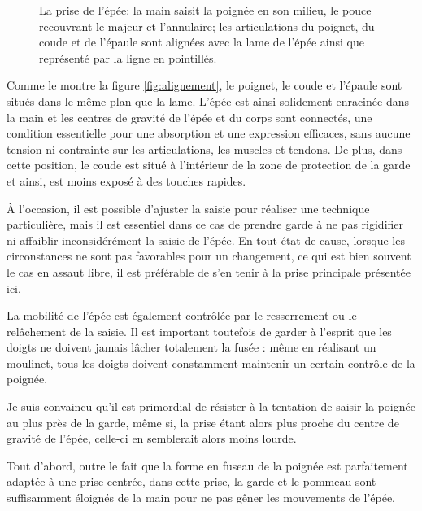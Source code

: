 \begin{figure}[ht]
	\centering
	\caption[La prise de l'épée]{La prise de l'épée:  la main saisit la poignée en son milieu, le pouce recouvrant le majeur et l'annulaire;
	 les articulations du poignet, du coude et de l'épaule sont alignées avec la lame de l'épée ainsi que représenté par la ligne en pointillés.}
\end{figure}

Comme le montre la figure \ref{fig:alignement}, le poignet, le coude et l'épaule sont situés dans le même plan que la lame.
L'épée est ainsi solidement enracinée dans la main et les centres de gravité de l'épée et du corps sont connectés, une condition essentielle pour une absorption et une expression efficaces, sans aucune tension ni contrainte sur les articulations, les muscles et tendons.
De plus, dans cette position, le coude est situé à l'intérieur de la zone de protection de la garde et ainsi, est moins exposé à des touches rapides.

\`{A} l'occasion, il est possible d'ajuster la saisie pour réaliser une technique particulière, mais il est essentiel dans ce cas de prendre garde à ne pas rigidifier ni affaiblir inconsidérément la saisie de l'épée.
En tout état de cause, lorsque les circonstances ne sont pas favorables pour un changement, ce qui est bien souvent le cas en assaut libre, il est préférable de s'en tenir à la prise principale présentée ici.

La mobilité de l'épée est également contrôlée par le resserrement ou le relâchement de la saisie. 
Il est important toutefois de garder à l'esprit que les doigts ne doivent jamais lâcher totalement la fusée : même en réalisant un moulinet, tous les doigts doivent constamment maintenir un certain contrôle de la poignée. 

Je suis convaincu qu'il est primordial de résister à la tentation de saisir la poignée au plus près de la garde, même si, la prise étant alors plus proche du centre de gravité de l'épée, celle-ci en semblerait alors moins lourde.

Tout d'abord, outre le fait que la forme en fuseau de la poignée est parfaitement adaptée à une prise centrée, dans cette prise, la garde et le pommeau sont suffisamment éloignés de la main pour ne pas gêner les mouvements de l'épée.

